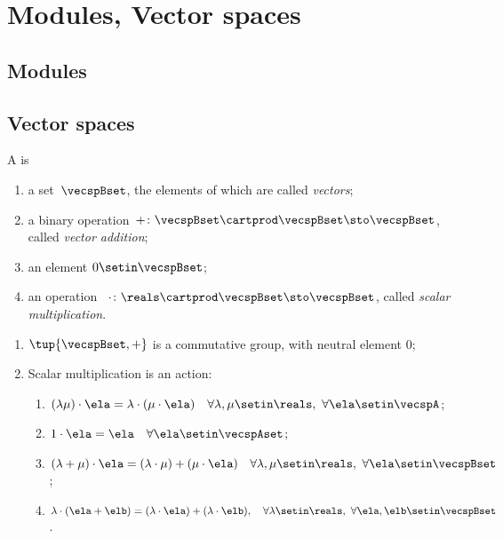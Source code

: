 
\section{Modules, Vector spaces}
\label{sec:vector-spaces}

\subsection{Modules}


\subsection{Vector spaces}




\begin{ctdefinition}
    \label{def:real-vector-space}
    A  is
    \begin{body}
        \constit
        \begin{enumerate}
            \item a set~$\vecspBset$, the elements of which are called \emph{vectors};
            \item a binary operation~$+ \colon \vecspBset \cartprod \vecspBset \sto \vecspBset$, called \emph{vector addition};
            \item an element $0 \setin \vecspBset$;
            \item an operation ~$\cdot \colon \reals \cartprod \vecspBset \sto \vecspBset$, called \emph{scalar multiplication}.
        \end{enumerate}
        \condit
        \begin{enumerate}
            \item $\tup{\vecspBset, +}$ is a commutative group, with neutral element $0$;
            \item Scalar multiplication is an action:
                  \begin{enumerate}
                      \item $(\lambda \mu) \cdot \ela = \lambda \cdot( \mu \cdot \ela) \quad \forall \lambda, \mu \setin \reals, \ \forall \ela \setin \vecspA$;
                      \item $1 \cdot \ela = \ela \quad \forall \ela \setin \vecspAset$;
                      \item $(\lambda + \mu) \cdot \ela = (\lambda \cdot \mu) + (\mu \cdot \ela) \quad \forall \lambda, \mu \setin \reals, \ \forall \ela \setin \vecspBset$;
                      \item $\lambda \cdot (\ela + \elb) = (\lambda \cdot \ela) + (\lambda \cdot \elb), \quad \forall \lambda \setin \reals, \ \forall \ela, \elb \setin \vecspBset$.
                  \end{enumerate}
        \end{enumerate}
    \end{body}
\end{ctdefinition}

